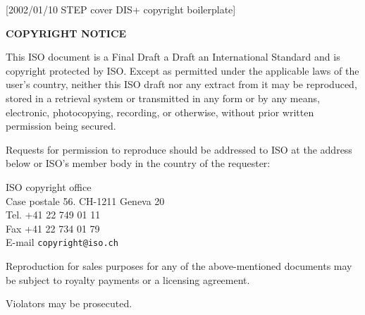 [2002/01/10 STEP cover DIS+ copyright boilerplate]

\vspace*{\baselineskip}
\textbf{\large COPYRIGHT NOTICE}

\begin{small}
This ISO document is
\iffdisstandard
  a Final Draft
\else
  \ifdisstandard
    a Draft
  \else
    an
  \fi
\fi
International
Standard and is copyright protected by ISO. Except
as permitted under the applicable laws of the user's
country, neither this ISO draft nor any extract from
it may be reproduced, stored in a retrieval system or
transmitted in any form or by any means, electronic,
photocopying, recording, or otherwise, without prior
written permission being secured.

Requests for permission to reproduce should be addressed
to ISO at the address below or ISO's member body in the
country of the requester:
\begin{center}
ISO copyright office \\
Case postale 56. CH-1211 Geneva 20 \\
Tel. +41 22 749 01 11 \\
Fax  +41 22 734 01 79 \\
E-mail \texttt{copyright@iso.ch}
\end{center}
Reproduction for sales purposes for any of the above-mentioned
documents may be subject to royalty payments or a licensing
agreement.

Violators may be prosecuted.

\end{small}

\endinput
